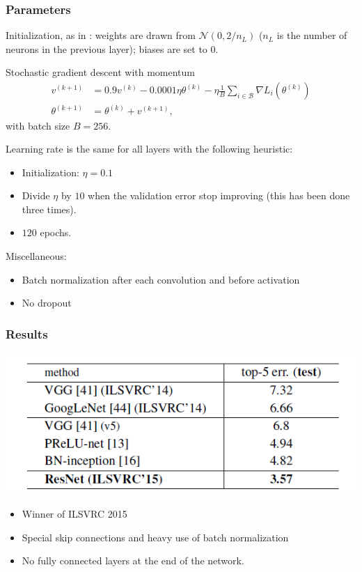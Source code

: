 \begin{frame}
	\frametitle{Parameters}

Initialization, as in \cite{he2015delving}: weights are drawn from $\mathcal{N}(0, 2/n_L)$ ($n_L$ is the number of neurons in the previous layer); biases are set to $0$.


	\begin{block}{Stochastic gradient descent with momentum}
		\begin{align*}
			v^{(k+1)} & = 0.9 v^{(k)} - 0.0001 \eta \theta^{(k)} - \eta \frac{1}{B} \sum_{i \in \mathcal{B}} \nabla L_i (\theta^{(k)})\\
			\theta^{(k+1)} & = \theta^{(k)} + v^{(k+1)},
		\end{align*}
		with batch size $B= 256$.
	\end{block}



	Learning rate is the same for all layers with the following heuristic:
	\begin{itemize}
		\item Initialization: $\eta = 0.1$
		\item Divide $\eta$ by $10$ when the validation error stop improving
		(this has been done three times).
		\item $120$ epochs.
	\end{itemize}

	Miscellaneous:
	\begin{itemize}
		\item Batch normalization after each convolution and before activation
		\item No dropout
	\end{itemize}
\end{frame}


\begin{frame}
	\frametitle{Results}


	\begin{center}
		\includegraphics[scale=1]{figs/ResNet_results}
	\end{center}

	\bigskip

	\begin{itemize}
		\item Winner of ILSVRC 2015
		\item Special skip connections and heavy use of batch normalization
		\item No fully connected layers at the end of the network.
	\end{itemize}



\end{frame}




